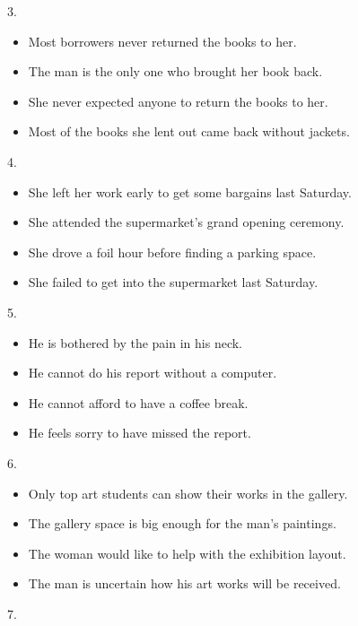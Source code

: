 \documentclass[UTF8,11pt]{ctexart}
\begin{document}
3.


\begin{itemize}[leftmargin=2em,itemsep=.2em,topsep=.4em]\item[A.] Most borrowers never returned the books to her.
\item[B.] The man is the only one who brought her book back.
\item[C.] She never expected anyone to return the books to her.
\item[D.] Most of the books she lent out came back without jackets.
\end{itemize}

4.


\begin{itemize}[leftmargin=2em,itemsep=.2em,topsep=.4em]\item[A.] She left her work early to get some bargains last Saturday.
\item[B.] She attended the supermarket’s grand opening ceremony.
\item[C.] She drove a foil hour before finding a parking space.
\item[D.] She failed to get into the supermarket last Saturday.
\end{itemize}

5.


\begin{itemize}[leftmargin=2em,itemsep=.2em,topsep=.4em]\item[A.] He is bothered by the pain in his neck.
\item[B.] He cannot do his report without a computer.
\item[C.] He cannot afford to have a coffee break.
\item[D.] He feels sorry to have missed the report.
\end{itemize}

6.


\begin{itemize}[leftmargin=2em,itemsep=.2em,topsep=.4em]\item[A.] Only top art students can show their works in the gallery.
\item[B.] The gallery space is big enough for the man’s paintings.
\item[C.] The woman would like to help with the exhibition layout.
\item[D.] The man is uncertain how his art works will be received.
\end{itemize}

7.
\end{document}
